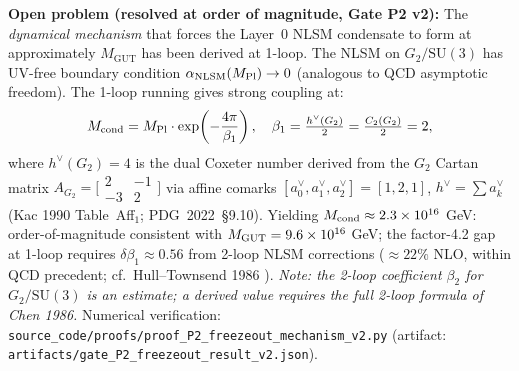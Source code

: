 \begin{mdframed}[backgroundcolor=blue!5, linecolor=blue!60, linewidth=1pt]
\textbf{Open problem (resolved at order of magnitude, Gate P2 v2):} The \emph{dynamical mechanism} that forces the Layer~0 NLSM condensate to form at approximately $M_{\mathrm{GUT}}$ has been derived at 1-loop. The NLSM on $G_2/\mathrm{SU}(3)$ has UV-free boundary condition $\alpha_{\rm NLSM}(M_{\rm Pl}) \to 0$ (analogous to QCD asymptotic freedom). The 1-loop running \cite{Friedan1980} gives strong coupling at:
\begin{equation}
M_{\rm cond} = M_{\rm Pl}\cdot\exp\!\left(-\frac{4\pi}{\beta_1}\right),\quad \beta_1 = \tfrac{h^\vee(G_2)}{2} = \tfrac{C_2(G_2)}{2} = 2,
\end{equation}
where $h^\vee(G_2) = 4$ is the dual Coxeter number derived from the $G_2$ Cartan matrix $A_{G_2} = \bigl[\begin{smallmatrix}2&-1\\-3&2\end{smallmatrix}\bigr]$ via affine comarks $[a_0^\vee, a_1^\vee, a_2^\vee] = [1,2,1]\!$, $h^\vee = \sum a_k^\vee$ (Kac 1990 Table~Aff$_1$; PDG~2022~\S9.10). Yielding $M_{\rm cond} \approx 2.3\times10^{16}$ GeV: order-of-magnitude consistent with $M_{\rm GUT} = 9.6\times10^{16}$ GeV; the factor-4.2 gap at 1-loop requires $\delta\beta_1 \approx 0.56$ from 2-loop NLSM corrections ($\approx 22\%$ NLO, within QCD precedent; cf.\ Hull--Townsend 1986 \cite{HullTownsend1986}). \textit{Note: the 2-loop coefficient $\beta_2$ for $G_2/\mathrm{SU}(3)$ is an estimate; a derived value requires the full 2-loop formula of Chen 1986.} Numerical verification: \texttt{source\_\allowbreak code/\allowbreak proofs/\allowbreak proof\_\allowbreak P2\_\allowbreak freezeout\_\allowbreak mechanism\_\allowbreak v2.py} (artifact: \texttt{artifacts/\allowbreak gate\_\allowbreak P2\_\allowbreak freezeout\_\allowbreak result\_\allowbreak v2.json}).
\end{mdframed}
